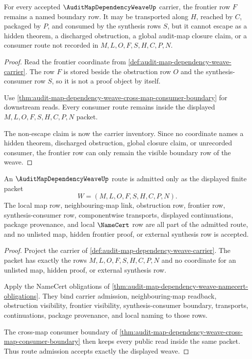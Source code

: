 \begin{theorem}
\label{thm:audit-map-dependency-weave-frontier-nonescape}
For every accepted $\AuditMapDependencyWeaveUp$ carrier, the frontier row $F$ remains a named boundary row. It may be transported along $H$, reached by $C$, packaged by $P$, and consumed by the synthesis rows $S$, but it cannot escape as a hidden theorem, a discharged obstruction, a global audit-map closure claim, or a consumer route not recorded in $M,L,O,F,S,H,C,P,N$.
\end{theorem}
\begin{proof}
Read the frontier coordinate from \autoref{def:audit-map-dependency-weave-carrier}. The row $F$ is stored beside the obstruction row $O$ and the synthesis-consumer row $S$, so it is not a proof object by itself.

Use \autoref{thm:audit-map-dependency-weave-cross-map-consumer-boundary} for downstream reads. Every consumer route remains inside the displayed $M,L,O,F,S,H,C,P,N$ packet.

The non-escape claim is now the carrier inventory. Since no coordinate names a hidden theorem, discharged obstruction, global closure claim, or unrecorded consumer, the frontier row can only remain the visible boundary row of the weave.
\end{proof}

\begin{theorem}
\label{thm:audit-map-dependency-weave-route-admission}
An $\AuditMapDependencyWeaveUp$ route is admitted only as the displayed finite packet
$$
W=(M,L,O,F,S,H,C,P,N).
$$
The local map row, neighbouring-map link, obstruction row, frontier row, synthesis-consumer row, componentwise transports, displayed continuations, package provenance, and local $\NameCert$ row are all part of the admitted route, and no unlisted map, hidden frontier proof, or external synthesis row is accepted.
\end{theorem}
\begin{proof}
Project the carrier of \autoref{def:audit-map-dependency-weave-carrier}. The packet has exactly the rows $M,L,O,F,S,H,C,P,N$ and no coordinate for an unlisted map, hidden proof, or external synthesis row.

Apply the NameCert obligations of \autoref{thm:audit-map-dependency-weave-namecert-obligations}. They bind carrier admission, neighbouring-map readback, obstruction visibility, frontier visibility, synthesis-consumer boundary, transports, continuations, package provenance, and local naming to those rows.

The cross-map consumer boundary of \autoref{thm:audit-map-dependency-weave-cross-map-consumer-boundary} then keeps every public read inside the same packet. Thus route admission accepts exactly the displayed weave.
\end{proof}

